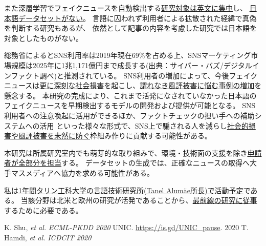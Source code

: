 また深層学習でフェイクニュースを自動検出する\underline{研究対象は英文に集中}し、
\underline{日本語データセットがない}。
言語に囚われず利用者による拡散された経緯で真偽を判断する研究もあるが\cite{tarek2020}、
依然として記事の内容を考慮した研究では日本語を対象としたものがない。

総務省によるとSNS利用率は2019年現在69\%を占める上、SNSマーケティング市場規模は2025年に1兆1,171億円まで成長する(出典：サイバー・バズ/デジタルインファクト調べ)と推測されている。
SNS利用者の増加によって、今後フェイクニュースは\underline{更に深刻な社会損害}を起こし、\underline{謂れなき風評被害に悩む事例の増加}を懸念する。
本研究の完成により、これまで活発になされていなかった日本語のフェイクニュースを早期検出するモデルの開発および提供が可能となる。
SNS利用者への注意喚起に活用ができるほか、ファクトチェックの担い手への補助システムへの活用
といった様々な形式で、SNS上で騙される人を減らし\underline{社会的損害や風評被害を未然に防ぐ}枠組み作りに貢献する可能性がある。


本研究は所属研究室内でも萌芽的な取り組みで、環境・技術面の支援を除き\underline{申請者が全部分を担当}する。
データセットの生成では、正確なニュースの取得へ大手マスメディアへ協力を求める可能性がある。

私は\underline{1年間タリン工科大学の言語技術研究所(Tanel Alumäe所長)で活動予定}である。
当該分野は北米と欧州の研究が活発であることから、\underline{最前線の研究に従事}するために必要である。

{\footnotesize 
\begin{twobibliography}{99}
    \setlength{\parskip}{0cm}
    \setlength{\itemsep}{0cm}
    \setcounter{enumiv}{9}
     K. Shu, \textit{et al.} \textit{ECML-PKDD 2020}
     UNIC. \url{https://is.gd/UNIC_pause}. 2020
     T. Hamdi, \textit{et al.} \textit{ICDCIT 2020}
\end{twobibliography}
}


